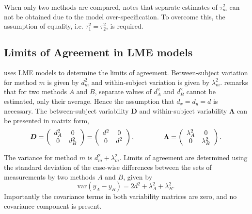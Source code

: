 \documentclass[12pt, a4paper]{article}
\theoremstyle{plain}
\theoremstyle{definition}
\theoremstyle{remark}
\begin{document}
	When only two methods are compared, \citet{BXC2008} notes that separate estimates of $\tau^2_m$ can not be obtained due to the model over-specification. To overcome this, the assumption of equality, i.e. $\tau^2_1 = \tau^2_2$, is required.
	\newpage
	
	\newpage
	
	\subsection{Limits of Agreement in LME models}
	\citet{BXC2008} uses LME models to determine the limits of agreement. Between-subject variation for method $m$ is given by $d^2_{m}$ and within-subject variation is given by $\lambda^2_{m}$.  \citet{BXC2008} remarks that for two methods $A$ and $B$, separate values of $d^2_{A}$ and $d^2_{B}$ cannot be estimated, only their average. Hence the assumption that $d_{x}= d_{y}= d$ is necessary. The between-subject variability $\boldsymbol{D}$ and within-subject variability $\boldsymbol{\Lambda}$ can be presented in matrix form,\[
	\boldsymbol{D} = \left(%
	\begin{array}{cc}
	d^2_{A}& 0 \\
	0 & d^2_{B} \\
	\end{array}%
	\right)=\left(%
	\begin{array}{cc}
	d^2& 0 \\
	0 & d^2\\
	\end{array}%
	\right),
	\hspace{1.5cm}
	\boldsymbol{\Lambda} = \left(%
	\begin{array}{cc}
	\lambda^2_{A}& 0 \\
	0 & \lambda^2_{B} \\
	\end{array}%
	\right).
	\]
	
	The variance for method $m$ is $d^2_{m}+\lambda^2_{m}$. Limits of agreement are determined using the standard deviation of the case-wise differences between the sets of measurements by two methods $A$ and $B$, given by
	\begin{equation}
	\mbox{var} (y_{A}-y_{B}) = 2d^2 + \lambda^2_{A}+ \lambda^2_{B}.
	\end{equation}
	Importantly the covariance terms in both variability matrices are zero, and no covariance component is present.
	
\end{document}
